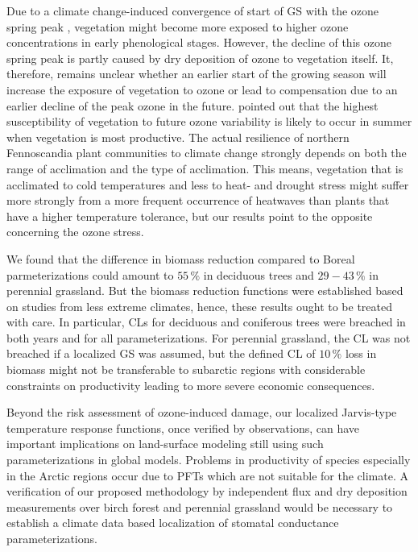 \documentclass[bg, manuscript]{copernicus}
\begin{document}
Due to a climate change-induced convergence of start of GS with the ozone spring peak \citep{EP:Karlsson2007}, vegetation might become more exposed to higher ozone concentrations in early phenological stages. However, the decline of this ozone spring peak is partly caused by dry deposition of ozone to vegetation itself. It, therefore, remains unclear whether an earlier start of the growing season will increase the exposure of vegetation to ozone or lead to compensation due to an earlier decline of the peak ozone in the future. \citet{ESPR:Hayes2021} pointed out that the highest susceptibility of vegetation to future ozone variability is likely to occur in summer when vegetation is most productive. The actual resilience of northern Fennoscandia plant communities to climate change strongly depends on both the range of acclimation and the type of acclimation. This means, vegetation that is acclimated to cold temperatures and less to heat- and drought stress might suffer more strongly from a more frequent occurrence of heatwaves than plants that have a higher temperature tolerance, but our results point to the opposite concerning the ozone stress.

We found that the difference in biomass reduction compared to Boreal parmeterizations \citep{ICP:MappingManual2017} could amount to $55\,\unit{\%}$ in deciduous trees and $29-43\,\unit{\%}$ in perennial grassland. But the biomass reduction functions were established based on studies from less extreme climates, hence, these results ought to be treated with care. In particular, CLs for deciduous and coniferous trees were breached in both years and for all parameterizations. For perennial grassland, the CL was not breached if a localized GS was assumed, but the defined CL of $10\,\unit{\%}$ loss in biomass might not be transferable to subarctic regions with considerable constraints on productivity leading to more severe economic consequences.

Beyond the risk assessment of ozone-induced damage, our localized Jarvis-type temperature response functions, once verified by observations, can have important implications on land-surface modeling still using such parameterizations in global models. Problems in productivity of species especially in the Arctic regions occur due to PFTs which are not suitable for the climate. A verification of our proposed methodology by independent flux and dry deposition measurements over birch forest and perennial grassland would be necessary to establish a climate data based localization of stomatal conductance parameterizations.
\end{document}
